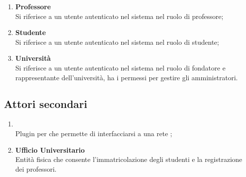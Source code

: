\documentclass[AnalisiDeiRequisiti.tex]{subfiles}
\begin{document}
\begin{enumerate}
	\item \textbf{Professore}\\
	Si riferisce a un utente autenticato nel sistema nel ruolo di professore;\\
	
	\item \textbf{Studente}\\
	Si riferisce a un utente autenticato nel sistema nel ruolo di studente;\\
		
	\item \textbf{Università}\\
	Si riferisce a un utente autenticato nel sistema nel ruolo di fondatore e rappresentante dell'università, ha i permessi per gestire gli amministratori.\\	
\end{enumerate}

\subsection{Attori secondari}
\begin{enumerate}
	\item \textbf{}\\
	Plugin per  che permette di interfacciarsi a una rete ;\\
	
	\item \textbf{Ufficio Universitario}\\
	Entità fisica che consente l'immatricolazione degli studenti e la registrazione dei professori.\\
\end{enumerate}
\end{document}
